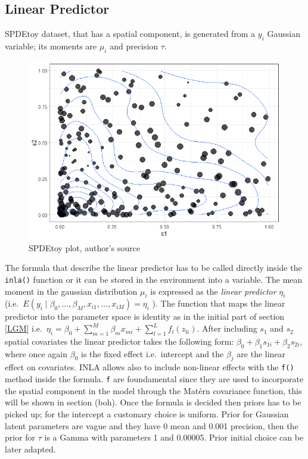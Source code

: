 \documentclass[
  12pt,
  a4paper,
  oneside]{book}
\theoremstyle{definition}
\theoremstyle{definition}
\theoremstyle{definition}
\theoremstyle{remark}
\begin{document}
\hypertarget{example}{%
\subsection{Linear Predictor}\label{example}}

SPDEtoy dataset, that has a spatial component, is generated from a \(y_{i}\) Gaussian variable; its moments are \(\mu_{i}\) and precision \(\tau\).

\begin{figure}
\centering
\includegraphics{images/cotour_toy.png}
\caption{SPDEtoy plot, author's source}
\end{figure}

The formula that describe the linear predictor has to be called directly inside the \texttt{inla()} function or it can be stored in the environment into a variable. The mean moment in the gaussian distribution \(\mu_{i}\) is expressed as the \emph{linear predictor} \(\eta_{i}\) (i.e.~\(E\left(y_{i} \mid \beta_{0}, \ldots, \beta_{M}, x_{i 1}, \ldots, x_{i M}\right) = \eta_{i}\) ). The function that maps the linear predictor into the parameter space is identity as in the initial part of section \ref{LGM} i.e.~\(\eta_{i}=\beta_{0}+\sum_{m=1}^{M} \beta_{m} x_{m i}+\sum_{l=1}^{L} f_{l}\left(z_{l i}\right)\).
After including \(s_{1}\) and \(s_{2}\) spatial covariates the linear predictor takes the following form: \(\beta_{0}+\beta_{1} s_{1 i}+\beta_{2} s_{2 i}\), where once again \(\beta_{0}\) is the fixed effect i.e.~intercept and the \(\beta_{j}\) are the linear effect on covariates. INLA allows also to include non-linear effects with the \texttt{f()} method inside the formula. \texttt{f} are foundamental since they are used to incorporate the spatial component in the model through the Matérn covariance function, this will be shown in section (boh).
Once the formula is decided then priors has to be picked up; for the intercept a customary choice is uniform. Prior for Gaussian latent parameters are vague and they have 0 mean and 0.001 precision, then the prior for \(\tau\) is a Gamma with parameters 1 and 0.00005. Prior initial choice can be later adapted.
\end{document}
